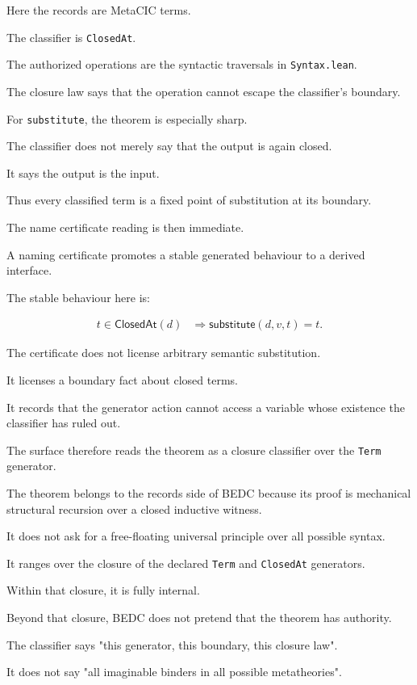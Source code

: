 Here the records are MetaCIC terms.

The classifier is \texttt{ClosedAt}.

The authorized operations are the syntactic traversals in
\texttt{Syntax.lean}.

The closure law says that the operation cannot escape the classifier's boundary.

For \texttt{substitute}, the theorem is especially sharp.

The classifier does not merely say that the output is again closed.

It says the output is the input.

Thus every classified term is a fixed point of substitution at its boundary.

The name certificate reading is then immediate.

A naming certificate promotes a stable generated behaviour to a derived
interface.

The stable behaviour here is:

$$
\begin{aligned}
  t \in \mathsf{ClosedAt}(d)
  &\Rightarrow
  \mathsf{substitute}(d,v,t)=t.
\end{aligned}
$$

The certificate does not license arbitrary semantic substitution.

It licenses a boundary fact about closed terms.

It records that the generator action cannot access a variable whose existence
the classifier has ruled out.

The \NameCert{} surface therefore reads the theorem as a closure classifier over
the \texttt{Term} generator.

The theorem belongs to the records side of BEDC because its proof is mechanical
structural recursion over a closed inductive witness.

It does not ask for a free-floating universal principle over all possible
syntax.

It ranges over the closure of the declared \texttt{Term} and \texttt{ClosedAt}
generators.

Within that closure, it is fully internal.

Beyond that closure, BEDC does not pretend that the theorem has authority.

The \NameCert{} classifier says "this generator, this boundary, this closure
law".

It does not say "all imaginable binders in all possible metatheories".

